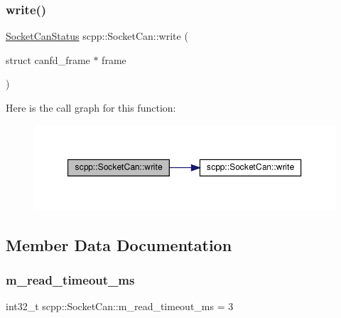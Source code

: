 \subsubsection{\texorpdfstring{write()}{write()}\hspace{0.1cm}{\footnotesize\ttfamily [3/3]}}
{\footnotesize\ttfamily \hyperlink{namespacescpp_abc60b9ed5f90c311397500d39ff15ef2}{Socket\+Can\+Status} scpp\+::\+Socket\+Can\+::write (\begin{DoxyParamCaption}\item[{struct canfd\+\_\+frame $\ast$}]{frame }\end{DoxyParamCaption})}

Here is the call graph for this function\+:
\nopagebreak
\begin{figure}[H]
\begin{center}
\leavevmode
\includegraphics[width=350pt]{classscpp_1_1SocketCan_a3e4e4ca4931587c466801e01183942f4_cgraph}
\end{center}
\end{figure}


\subsection{Member Data Documentation}
\mbox{\label{classscpp_1_1SocketCan_aa4d51fc60ada0d6ce29c112adedad63b}} 
\subsubsection{\texorpdfstring{m\+\_\+read\+\_\+timeout\+\_\+ms}{m\_read\_timeout\_ms}}
{\footnotesize\ttfamily int32\+\_\+t scpp\+::\+Socket\+Can\+::m\+\_\+read\+\_\+timeout\+\_\+ms = 3\hspace{0.3cm}{\ttfamily [private]}}

\mbox{\label{classscpp_1_1SocketCan_a5a69eb3524f4dcc15bff5080934d60c8}} 
